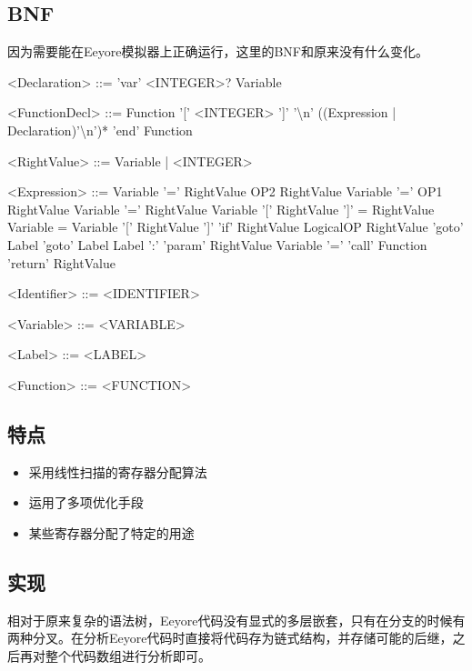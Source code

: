 \documentclass{ctexart}
\newenvironment{typewriterfont}{\ttfamily}{\par}
\begin{document}
\subsection{BNF}
因为需要能在Eeyore模拟器上正确运行，这里的BNF和原来没有什么变化。
\begin{typewriterfont}
\setlength{\grammarindent}{8em} %
\begin{grammar}
<Declaration> ::= 'var' <INTEGER>? Variable

<FunctionDecl> ::= Function '[' <INTEGER> ']' '\textbackslash n' ((Expression | Declaration)'\textbackslash n')* 'end' Function

<RightValue> ::= Variable | <INTEGER>

<Expression>	::=	Variable '=' RightValue OP2 RightValue
\alt Variable '=' OP1 RightValue
\alt Variable '=' RightValue
\alt Variable '[' RightValue ']' = RightValue
\alt Variable = Variable '[' RightValue ']'
\alt 'if' RightValue LogicalOP RightValue 'goto' Label
\alt 'goto' Label
\alt Label ':'
\alt 'param' RightValue
\alt Variable '=' 'call' Function
\alt 'return' RightValue


<Identifier>	::=	<IDENTIFIER>

<Variable> ::= <VARIABLE>

<Label> ::= <LABEL>

<Function> ::= <FUNCTION>

\end{grammar}
\end{typewriterfont}

\subsection{特点}

\begin{itemize}
  \item 采用线性扫描的寄存器分配算法
  \item 运用了多项优化手段
  \item 某些寄存器分配了特定的用途
\end{itemize}

\subsection{实现}

相对于原来复杂的语法树，Eeyore代码没有显式的多层嵌套，只有在分支的时候有两种分叉。在分析Eeyore代码时直接将代码存为链式结构，并存储可能的后继，之后再对整个代码数组进行分析即可。
\end{document}
